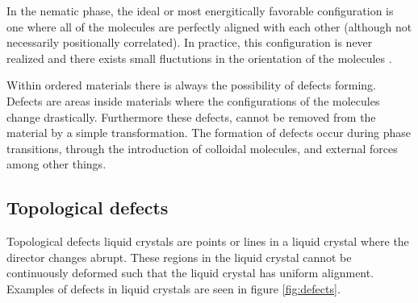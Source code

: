 \documentclass[preprint, aps]{revtex4-1}
\begin{document}
In the nematic phase, the ideal or most energitically favorable configuration is
 one where all of the molecules are perfectly aligned with each other (although 
not necessarily positionally correlated). In practice, this configuration is 
never realized and there exists small fluctutions in the orientation of the 
molecules \cite{degennes95}.

Within ordered materials there is always the possibility of defects 
forming. Defects are areas inside materials where the configurations of the 
molecules change drastically. Furthermore these defects, cannot be removed from 
the material by a simple transformation. The formation of defects occur during 
phase transitions, through the introduction of colloidal molecules, and external
forces among other things.

\subsection*{Topological defects}
Topological defects liquid crystals are points or lines in a liquid crystal 
where the director changes abrupt. These regions in the liquid crystal cannot be
continuously deformed such that the liquid crystal has uniform alignment. 
Examples of defects in liquid crystals are seen in figure \ref{fig:defects}.
\end{document}
